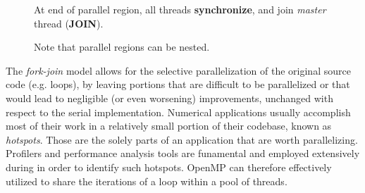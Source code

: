 \begin{description}
\begin{figure}[H]
{\begin{inparaenum}
			\item At end of parallel region, all threads \textbf{synchronize}, and join \textit{master} thread (\textbf{JOIN}).
		\end{inparaenum} Note that parallel regions can be nested.}
	\label{fig:omp_fork-join}
\end{figure}
    The \textit{fork-join} model allows for the selective parallelization of
    the original source code (e.g. loops), by leaving portions that
    are difficult to be parallelized or that would lead to negligible
    (or even worsening) improvements, unchanged with respect to the
    serial implementation.
    Numerical applications usually accomplish most of their work in a relatively small portion of their codebase, known as \textit{hotspots}. Those are the solely parts of an application that are worth parallelizing. Profilers and performance analysis tools are funamental and employed extensively during in order to identify such hotspots.   
    OpenMP can therefore effectively utilized to share the iterations of a loop within a pool of threads.
    

\end{description}
